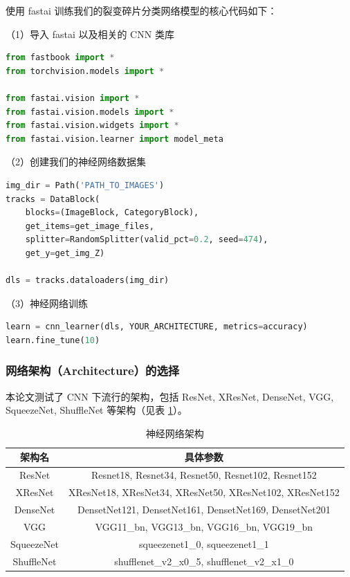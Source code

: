 \documentclass[AutoFakeBold]{LZUThesis}
\begin{document}
使用 fastai 训练我们的裂变碎片分类网络模型的核心代码如下：

（1）导入 fastai 以及相关的 CNN 类库
\begin{lstlisting}[language = python]
from fastbook import *
from torchvision.models import *

from fastai.vision import *
from fastai.vision.models import *
from fastai.vision.widgets import *
from fastai.vision.learner import model_meta
\end{lstlisting}

（2）创建我们的神经网络数据集
\begin{lstlisting}[language = python]
img_dir = Path('PATH_TO_IMAGES')
tracks = DataBlock(
    blocks=(ImageBlock, CategoryBlock),
    get_items=get_image_files, 
    splitter=RandomSplitter(valid_pct=0.2, seed=474),
    get_y=get_img_Z)

dls = tracks.dataloaders(img_dir)
\end{lstlisting}


（3）神经网络训练
\begin{lstlisting}[language = python]
learn = cnn_learner(dls, YOUR_ARCHITECTURE, metrics=accuracy)
learn.fine_tune(10)
\end{lstlisting}




\subsubsection{网络架构（Architecture）的选择}
本论文测试了 CNN 下流行的架构，包括 ResNet, XResNet, DenseNet, VGG, SqueezeNet, ShuffleNet 等架构（见表 \ref{tbl_architectures}）。


\begin{table}[H]
    \centering
    \caption{神经网络架构}
    \begin{tabular}{cc} %
    \toprule
    架构名 & 具体参数 \\
    \midrule
    ResNet & Resnet18, Resnet34, Resnet50, Resnet102, Resnet152 \\
    XResNet & XResNet18, XResNet34, XResNet50, XResNet102, XResNet152 \\
    DenseNet & DensetNet121, DensetNet161, DensetNet169, DensetNet201 \\
    VGG & VGG11\_bn, VGG13\_bn, VGG16\_bn, VGG19\_bn \\
    SqueezeNet & squeezenet1\_0, squeezenet1\_1 \\
    ShuffleNet & shufflenet\_v2\_x0\_5, shufflenet\_v2\_x1\_0 \\
    \bottomrule
    \end{tabular}
    \label{tbl_architectures}
\end{table}
\end{document}
